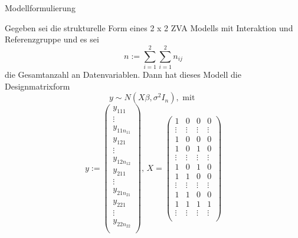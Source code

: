 \documentclass[
  8pt,
  ignorenonframetext,
]{beamer}
\begin{document}
\begin{frame}{Modellformulierung}
\protect\hypertarget{modellformulierung-9}{}
\footnotesize
{}
\vspace{2mm}
\begin{theorem}
\justifying
\normalfont
Gegeben sei die strukturelle Form eines 2 x 2 ZVA Modells mit Interaktion und Referenzgruppe
und es sei
\begin{equation}
n := \sum_{i=1}^2 \sum_{i=1}^2 n_{ij}
\end{equation}
die Gesamtanzahl an Datenvariablen. Dann hat dieses Modell die Designmatrixform
\begin{equation}
y \sim N(X\beta,\sigma^2I_n), \mbox{ mit }
\end{equation}
\begin{equation}
y:=
\begin{pmatrix}
y_{111}\\
\vdots \\
y_{11n_{11}}\\
y_{121}\\
\vdots \\
y_{12n_{12}}\\
y_{211}\\
\vdots \\
y_{21n_{21}}\\
y_{221}\\
\vdots \\
y_{22n_{22}}\\
\end{pmatrix}, \,
X =
\begin{pmatrix}
1       &   0       &   0        &  0       \\
\vdots  &   \vdots  &   \vdots   &  \vdots  \\
1       &   0       &   0        &  0       \\
1       &   0       &   1        &  0       \\
\vdots  &   \vdots  &   \vdots   &  \vdots  \\
1       &   0       &   1        &  0       \\
1       &   1       &   0        &  0       \\
\vdots  &   \vdots  &   \vdots   &  \vdots  \\
1       &   1       &   0        &  0       \\
1       &   1       &   1        &  1       \\
\vdots  &   \vdots  &   \vdots   &  \vdots  \\

\end{pmatrix}
\end{equation}
\end{theorem}
\end{frame}
\end{document}
